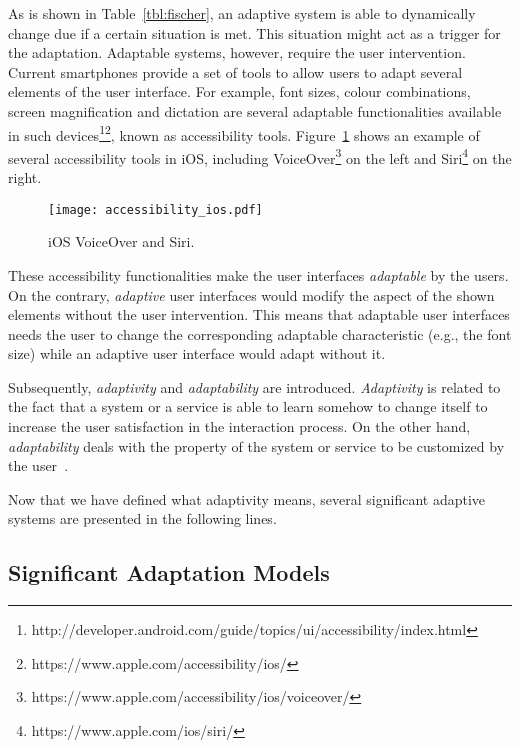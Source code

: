 As is shown in Table~\ref{tbl:fischer}, an adaptive system is able to dynamically 
change due if a certain situation is met. This situation might act as a trigger
for the adaptation. Adaptable systems, however, require the user intervention. 
Current smartphones provide a set of tools to allow users to adapt several 
elements of the user interface. For example, font sizes, colour combinations, 
screen magnification and dictation are several adaptable functionalities available 
in such devices\footnote{http://developer.android.com/guide/topics/ui/accessibility/index.html}\footnote{https://www.apple.com/accessibility/ios/},
known as accessibility tools. Figure~\ref{fig:accessibility_ios} shows an example 
of several accessibility tools in iOS, including VoiceOver\footnote{https://www.apple.com/accessibility/ios/voiceover/}
on the left and Siri\footnote{https://www.apple.com/ios/siri/} on the right.

\begin{figure}
\centering
\texttt{[image: accessibility\_ios.pdf]}
\caption{iOS VoiceOver and Siri.}
\label{fig:accessibility_ios}
\end{figure}

These accessibility functionalities make the user interfaces \textit{adaptable}
by the users. On the contrary, \textit{adaptive} user interfaces would modify 
the aspect of the shown elements without the user intervention. This means that 
adaptable user interfaces needs the user to change the corresponding adaptable 
characteristic (e.g., the font size) while an adaptive user interface would 
adapt without it.

Subsequently, \textit{adaptivity} and \textit{adaptability} are introduced. 
\textit{Adaptivity} is related to the fact that a system or a service is able to 
learn somehow to change itself to increase the user satisfaction in the interaction 
process. On the other hand, \textit{adaptability} deals with the property of the 
system or service to be customized by the user~\citep{jameson_modelling_2001}.

Now that we have defined what adaptivity means, several significant adaptive 
systems are presented in the following lines.

\subsection{Significant Adaptation Models}
\label{sec:significant_adaptation_models}

